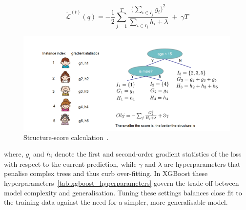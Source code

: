\documentclass{SGGW-thesis-EN}
\begin{document}
\begin{figure}[h!]
  \centering
  \begin{minipage}[c]{0.45\textwidth}
    \[
      \tilde{\mathcal{L}}^{(t)}(q) =
      -\frac{1}{2}\sum_{j=1}^{T}
      \frac{\bigl(\sum_{i \in I_j} g_i\bigr)^2}
           {\sum_{i \in I_j} h_i + \lambda}
      \;+\; \gamma T
    \] 
  \end{minipage}\hfill
  \begin{minipage}[c]{0.55\textwidth}
    \centering
    \includegraphics[width=\linewidth]{images/structure_score_calculation.png}
    \caption{Structure-score calculation~\cite{Chen_2016}.}
    \label{fig:structure_score_calculation}
  \end{minipage}
\end{figure}
\noindent where, \(g_i\) and \(h_i\) denote the first and second-order gradient statistics of the loss with
respect to the current prediction, while \(\gamma\) and \(\lambda\) are hyperparameters that penalise
complex trees and thus curb over-fitting.
In XGBoost these hyperparameters~\ref{tab:xgboost_hyperparameters} govern the trade-off between model complexity and
generalisation. Tuning these settings balances close fit to the training data against the need for a simpler,
more generalisable model.
\end{document}
